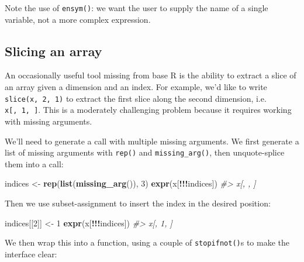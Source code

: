 \documentclass[]{book}
\newenvironment{Shaded}{\begin{snugshade}}{\end{snugshade}}
\newcommand{\CommentTok}[1]{\textcolor[rgb]{0.37,0.37,0.37}{\textit{#1}}}
\newcommand{\DecValTok}[1]{\textcolor[rgb]{0.06,0.06,0.06}{#1}}
\newcommand{\KeywordTok}[1]{\textcolor[rgb]{0.27,0.27,0.27}{\textbf{#1}}}
\newcommand{\NormalTok}[1]{#1}
\newcommand{\OperatorTok}[1]{\textcolor[rgb]{0.43,0.43,0.43}{\textbf{#1}}}
\newcommand{\StringTok}[1]{\textcolor[rgb]{0.5,0.5,0.5}{#1}}
\begin{document}
Note the use of \texttt{ensym()}: we want the user to supply the name of a single variable, not a more complex expression.

\hypertarget{slicing-an-array}{%
\subsection{Slicing an array}\label{slicing-an-array}}


An occasionally useful tool missing from base R is the ability to extract a slice of an array given a dimension and an index. For example, we'd like to write \texttt{slice(x,\ 2,\ 1)} to extract the first slice along the second dimension, i.e. \texttt{x{[},\ 1,\ {]}}. This is a moderately challenging problem because it requires working with missing arguments.

We'll need to generate a call with multiple missing arguments. We first generate a list of missing arguments with \texttt{rep()} and \texttt{missing\_arg()}, then unquote-splice them into a call:

\begin{Shaded}
\begin{Highlighting}[]
\NormalTok{indices <-}\StringTok{ }\KeywordTok{rep}\NormalTok{(}\KeywordTok{list}\NormalTok{(}\KeywordTok{missing_arg}\NormalTok{()), }\DecValTok{3}\NormalTok{)}
\KeywordTok{expr}\NormalTok{(x[}\OperatorTok{!!!}\NormalTok{indices])}
\CommentTok{#> x[, , ]}
\end{Highlighting}
\end{Shaded}

Then we use subset-assignment to insert the index in the desired position:

\begin{Shaded}
\begin{Highlighting}[]
\NormalTok{indices[[}\DecValTok{2}\NormalTok{]] <-}\StringTok{ }\DecValTok{1}
\KeywordTok{expr}\NormalTok{(x[}\OperatorTok{!!!}\NormalTok{indices])}
\CommentTok{#> x[, 1, ]}
\end{Highlighting}
\end{Shaded}

We then wrap this into a function, using a couple of \texttt{stopifnot()}s to make the interface clear:
\end{document}
